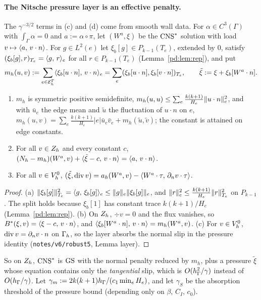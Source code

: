 \paragraph{The Nitsche pressure layer is an effective penalty.} The $\gamma^{-3/2}$ terms in (c) and (d) come from smooth wall data. For $\alpha\in C^3(\Gamma)$ with $\int_\Gamma\alpha=0$ and $a:=\alpha\circ\pi$, let $(W^a,\xi)$ be the $\mathrm{CNS}^\ast$ solution with load $v\mapsto\langle a,\, v\cdot n\rangle$. For $g\in L^2(e)$ let $\xi_b[g]\in P_{k-1}(T_e)$, extended by $0$, satisfy $(\xi_b[g],r)_{T_e}=\langle g,\, r\rangle_e$ for all $r\in P_{k-1}(T_e)$ (Lemma~\ref{pd:lem:rep}), and put
\[
m_h(u,v):=\sum_{e\in\mathcal E_h^\Gamma}\langle \xi_b[u\cdot n],\, v\cdot n\rangle_e=\sum_e(\xi_b[u\cdot n],\xi_b[v\cdot n])_{T_e},\qquad \tilde\xi:=\xi+\xi_b[W^a\cdot n].
\]

\begin{lemma}\label{rb:lem:mh}
\begin{enumerate}[label=(\alph*)]
\item $m_h$ is symmetric positive semidefinite, $m_h(u,u)\le\sum_e\frac{k(k+1)}{H_e}\lVert u\cdot n\rVert_e^2$, and with $\bar u_e$ the edge mean and $\tilde u$ the fluctuation of $u\cdot n$ on $e$, $m_h(u,v)=\sum_e\frac{k(k+1)}{H_e}|e|\bar u_e\bar v_e+m_h(\tilde u,\tilde v)$; the constant is attained on edge constants.
\item For all $v\in Z_h$ and every constant $c$, $(N_h-m_h)(W^a,v)+\langle \tilde\xi-c,\, v\cdot n\rangle=\langle a,\, v\cdot n\rangle$.
\item For all $v\in V_h^0$, $(\tilde\xi,\operatorname{div} v)=a_h(W^a,v)-\langle W^a\cdot\tau,\, \partial_n v\cdot\tau\rangle$.
\end{enumerate}
\end{lemma}

\begin{proof}
(a) $\lVert \xi_b[g]\rVert_{T_e}^2=\langle g,\, \xi_b[g]\rangle_e\le\lVert g\rVert_e\lVert \xi_b[g]\rVert_e$, and $\lVert r\rVert_e^2\le\frac{k(k+1)}{H_e}\lVert r\rVert_{T_e}^2$ on $P_{k-1}$ \cite{WarburtonHesthaven2003}. The split holds because $\xi_b[1]$ has constant trace $k(k+1)/H_e$ (Lemma~\ref{pd:lem:rep}). (b) On $Z_h$, $\div v=0$ and the flux vanishes, so $B^\ast(\xi,v)=\langle \xi-c,\, v\cdot n\rangle$, and $\langle \xi_b[W^a\cdot n],\, v\cdot n\rangle=m_h(W^a,v)$. (c) For $v\in V_h^0$, $\operatorname{div} v=\partial_n v\cdot n$ on $\Gamma_h$, so the layer absorbs the normal slip in the pressure identity (\texttt{notes/v6/robust5}, Lemma layer).
\end{proof}

So on $Z_h$, $\mathrm{CNS}^\ast$ is $\mathrm{GS}$ with the normal penalty reduced by $m_h$, plus a pressure $\tilde\xi$ whose equation contains only the \emph{tangential} slip, which is $O(h_\Gamma^2/\gamma)$ instead of $O(h_\Gamma/\gamma)$. Let $\gamma_m:=2k(k+1)h_\Gamma/(c_1\min_eH_e)$, and let $\gamma_S$ be the absorption threshold of the pressure bound (depending only on $\beta$, $C_I$, $c_0$).

